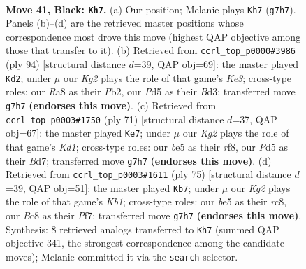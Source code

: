 \documentclass[11pt]{article}
\begin{document}
\clearpage

\begin{figure}[p]\centering
\begin{subfigure}{0.46\textwidth}\centering
\resizebox{\linewidth}{!}{%
\newchessgame
\chessboard[
  setfen={r1bN4/6k1/2P1p3/Pp1pB3/8/1nP2K2/8/R7 b - - 5 41},
  showmover=false,
  pgfstyle=straightmove, color=movearrow, markmove={g7-h7}
]}
\caption{}
\end{subfigure}\hfill
\begin{subfigure}{0.46\textwidth}\centering
\resizebox{\linewidth}{!}{%
\newchessgame
\chessboard[
  setfen={5k2/8/1R1n1p2/pP2rp1p/7P/3BK1P1/1P6/8 w - - 1 48},
  showmover=false,
  pgfstyle=straightmove, color=movearrow, markmove={e3-d2}
]}
\caption{}
\end{subfigure}
\\[4pt]
\begin{subfigure}{0.46\textwidth}\centering
\resizebox{\linewidth}{!}{%
\newchessgame
\chessboard[
  setfen={3k1R2/3b2p1/8/1p5p/4rP2/1B2p3/P3K1PP/8 b - - 3 36},
  showmover=false,
  pgfstyle=straightmove, color=movearrow, markmove={d8-e7}
]}
\caption{}
\end{subfigure}\hfill
\begin{subfigure}{0.46\textwidth}\centering
\resizebox{\linewidth}{!}{%
\newchessgame
\chessboard[
  setfen={1kR5/5p2/3p4/3Pb3/1P4B1/7P/KP3r2/8 b - - 6 38},
  showmover=false,
  pgfstyle=straightmove, color=movearrow, markmove={b8-b7}
]}
\caption{}
\end{subfigure}
\caption{\textbf{Move 41, Black: \texttt{Kh7}.} (a) Our position; Melanie plays \texttt{Kh7} (\texttt{g7h7}). Panels (b)--(d) are the retrieved master positions whose correspondence most drove this move (highest QAP objective among those that transfer to it). (b) Retrieved from \texttt{ccrl\_top\_p0000\#3986} (ply 94) [structural distance $d$=39, QAP obj=69]: the master played \texttt{Kd2}; under $\mu$ our \emph{Kg2} plays the role of that game's \emph{Ke3}; cross-type roles: our \emph{R}a8 as their \emph{P}b2, our \emph{P}d5 as their \emph{B}d3; transferred move \texttt{g7h7} \textbf{(endorses this move)}. (c) Retrieved from \texttt{ccrl\_top\_p0003\#1750} (ply 71) [structural distance $d$=37, QAP obj=67]: the master played \texttt{Ke7}; under $\mu$ our \emph{Kg2} plays the role of that game's \emph{Kd1}; cross-type roles: our \emph{b}e5 as their \emph{r}f8, our \emph{P}d5 as their \emph{B}d7; transferred move \texttt{g7h7} \textbf{(endorses this move)}. (d) Retrieved from \texttt{ccrl\_top\_p0003\#1611} (ply 75) [structural distance $d$=39, QAP obj=51]: the master played \texttt{Kb7}; under $\mu$ our \emph{Kg2} plays the role of that game's \emph{Kb1}; cross-type roles: our \emph{b}e5 as their \emph{r}c8, our \emph{B}c8 as their \emph{P}f7; transferred move \texttt{g7h7} \textbf{(endorses this move)}. Synthesis: 8 retrieved analogs transferred to \texttt{Kh7} (summed QAP objective 341, the strongest correspondence among the candidate moves); Melanie committed it via the \texttt{search} selector.}
\label{fig:thought-m81}
\end{figure}
\end{document}
